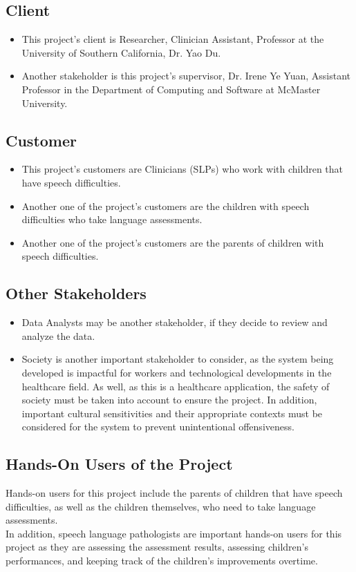 \documentclass[12pt]{article}
\begin{document}
\subsection{Client}
  \begin{itemize}
    \item This project's client is Researcher, Clinician Assistant, Professor at the University of Southern California, Dr. Yao Du.
    \item Another stakeholder is this project's supervisor, Dr. Irene Ye Yuan, Assistant Professor in the Department of Computing and Software at McMaster University.
  \end{itemize}
  \subsection{Customer}
  \begin{itemize}
    \item This project's customers are Clinicians (SLPs) who work with children that have speech difficulties.
    \item Another one of the project's customers are the children with speech difficulties who take language assessments.
    \item Another one of the project's customers are the parents of children with speech difficulties.
  \end{itemize}
  \subsection{Other Stakeholders}
  \begin{itemize}
    \item Data Analysts may be another stakeholder, if they decide to review and analyze the data.
    \item Society is another important stakeholder to consider, as the system being developed is impactful for workers and technological developments in the healthcare field.
          As well, as this is a healthcare application, the safety of society must be taken into account to ensure the project.
          In addition, important cultural sensitivities and their appropriate contexts must be considered for the system to prevent unintentional offensiveness.
  \end{itemize}
\subsection{Hands-On Users of the Project}
\hspace{2em}Hands-on users for this project include the parents of children that have speech difficulties, as well as the children themselves, who need to take language assessments.\\
\indent In addition, speech language pathologists are important hands-on users for this project as they are assessing the assessment results, assessing children's performances, and keeping track of the children's improvements overtime. 
\end{document}
